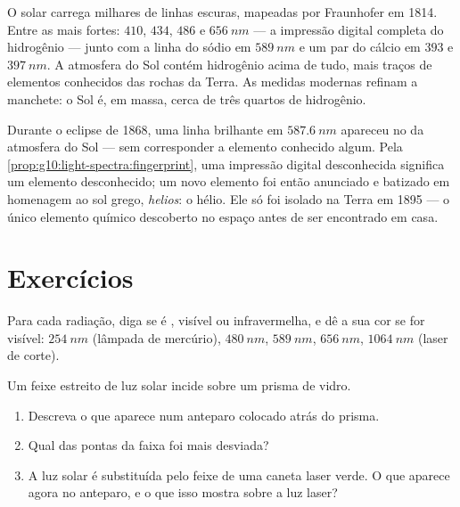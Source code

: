 \begin{example}\label{ex:g10:light-spectra:sunrecipe}
O  solar carrega milhares de linhas escuras, mapeadas por Fraunhofer
em 1814. Entre as mais fortes: $410$, $434$, $486$ e $\qty{656}{nm}$ --- a
impressão digital completa do hidrogênio --- junto com a linha do sódio em
$\qty{589}{nm}$ e um par do cálcio em $393$ e $\qty{397}{nm}$. A atmosfera
do Sol contém hidrogênio acima de tudo, mais traços de elementos conhecidos
das rochas da Terra. As medidas modernas refinam a manchete: o Sol é, em
massa, cerca de três quartos de hidrogênio.
\end{example}

\begin{remark}\label{rem:g10:light-spectra:helium}
Durante o eclipse de 1868, uma linha brilhante em $\qty{587.6}{nm}$ apareceu
no  da atmosfera do Sol --- sem corresponder a elemento conhecido
algum. Pela \cref{prop:g10:light-spectra:fingerprint}, uma impressão digital
desconhecida significa um elemento desconhecido; um novo elemento foi então
anunciado e batizado em homenagem ao sol grego, \emph{helios}: o hélio. Ele
só foi isolado na Terra em 1895 --- o único elemento químico descoberto no
espaço antes de ser encontrado em casa.
\end{remark}

\section{Exercícios}

\begin{exercise}[$\star$]\label{exo:g10:light-spectra:1}
Para cada radiação, diga se é , visível ou infravermelha, e dê a
sua cor se for visível: $\qty{254}{nm}$ (lâmpada de mercúrio),
$\qty{480}{nm}$, $\qty{589}{nm}$, $\qty{656}{nm}$, $\qty{1064}{nm}$ (laser
de corte).
\end{exercise}

\begin{exercise}[$\star$]\label{exo:g10:light-spectra:2}
Um feixe estreito de luz solar incide sobre um prisma de vidro.
\begin{enumerate}
  \item Descreva o que aparece num anteparo colocado atrás do prisma.
  \item Qual das pontas da faixa foi mais desviada?
  \item A luz solar é substituída pelo feixe de uma caneta laser verde. O
        que aparece agora no anteparo, e o que isso mostra sobre a luz
        laser?
\end{enumerate}
\end{exercise}

